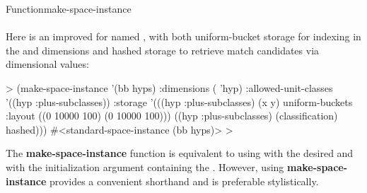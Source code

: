 \documentclass[10pt,twoside,english,pdftex]{article}
\begin{document}
\begin{functiondoc}{Function}{make-space-instance}{
      \\ 
      \\
    \returns{} }
Here is an improved  for 
 named , with both uniform-bucket storage for
indexing in the  and  dimensions and hashed storage to
retrieve match candidates via  dimensional values:
%
\W\supp
\begin{example}
  > (make-space-instance '(bb hyps)
       :dimensions ( 'hyp)
       :allowed-unit-classes '((hyp :plus-subclasses))
       :storage '(((hyp :plus-subclasses) (x y) 
                   uniform-buckets :layout ((0 10000 100)
                                            (0 10000 100)))
                  ((hyp :plus-subclasses) (classification) 
                   hashed)))
  #<standard-space-instance (bb hyps)>
  >
\end{example}

\fnnote The \textbf{make-space-instance} function is equivalent to using
\textbf{} with the desired  and
with the initialization argument  containing the
.  However, using \textbf{make-space-instance}
provides a convenient shorthand and is preferable stylistically.

\end{functiondoc}

\end{document}
